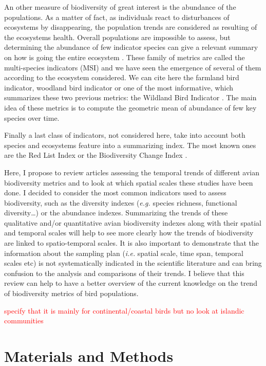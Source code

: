 \documentclass[
  12pt,
  oneside]{report}
\begin{document}
An other measure of biodiversity of great interest is the abundance of the populations. As a matter of fact, as individuals react to disturbances of ecosystems by disappearing, the population trends are considered as resulting of the ecosystems health. Overall populations are impossible to assess, but determining the abundance of few indicator species can give a relevant summary on how is going the entire ecosystem \citep{gregory_developing_2005}. These family of metrics are called the multi-species indicators (MSI) and we have seen the emergence of several of them according to the ecosystem considered. We can cite here the farmland bird indicator, woodland bird indicator or one of the most informative, which summarizes these two previous metrics: the Wildland Bird Indicator \citep{gregory_generation_1999, gregory_wild_2010}. The main idea of these metrics is to compute the geometric mean of abundance of few key species over time.

Finally a last class of indicators, not considered here, take into account both species and ecosystems feature into a summarizing index. The most known ones are the Red List Index \citep{butchart_improvements_2007, butchart_using_2005, butchart_measuring_2004} or the Biodiversity Change Index \citep{normander_indicator_2012}.

Here, I propose to review articles assessing the temporal trends of different avian biodiversity metrics and to look at which spatial scales these studies have been done. I decided to consider the most common indicators used to assess biodiversity, such as the diversity indexes (\emph{e.g.} species richness, functional diversity\ldots) or the abundance indexes. Summarizing the trends of these qualitative and/or quantitative avian biodiversity indexes along with their spatial and temporal scales will help to see more clearly how the trends of biodiversity are linked to spatio-temporal scales. It is also important to demonstrate that the information about the sampling plan (\emph{i.e.} spatial scale, time span, temporal scales etc) is not systematically indicated in the scientific literature and can bring confusion to the analysis and comparisons of their trends. I believe that this review can help to have a better overview of the current knowledge on the trend of biodiversity metrics of bird populations.

\textcolor{red}{specify that it is mainly for continental/coastal birds but no look at  islandic communities}

\hypertarget{materials-and-methods}{%
\chapter{Materials and Methods}\label{materials-and-methods}}
\end{document}
